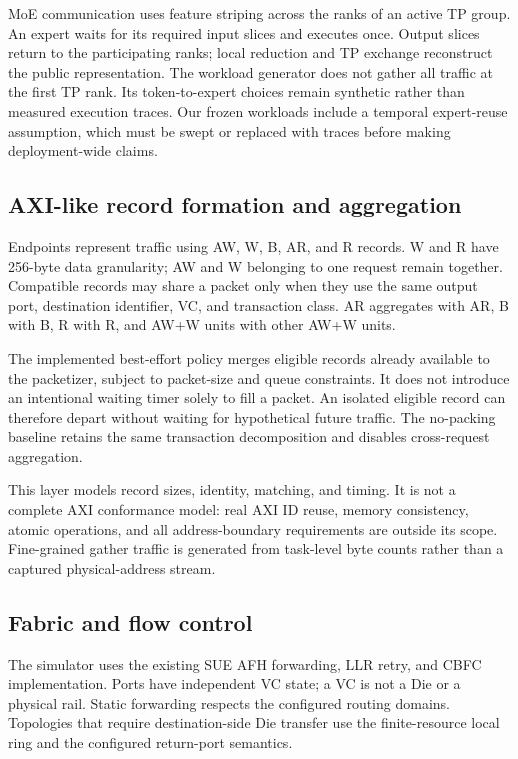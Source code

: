 \documentclass[conference]{IEEEtran}
\begin{document}
MoE communication uses feature striping across the ranks of an active TP group. An expert waits for its required input slices and executes once. Output slices return to the participating ranks; local reduction and TP exchange reconstruct the public representation. The workload generator does not gather all traffic at the first TP rank. Its token-to-expert choices remain synthetic rather than measured execution traces. Our frozen workloads include a temporal expert-reuse assumption, which must be swept or replaced with traces before making deployment-wide claims.

\subsection{AXI-like record formation and aggregation}
Endpoints represent traffic using AW, W, B, AR, and R records. W and R have 256-byte data granularity; AW and W belonging to one request remain together. Compatible records may share a packet only when they use the same output port, destination identifier, VC, and transaction class. AR aggregates with AR, B with B, R with R, and AW+W units with other AW+W units.

The implemented best-effort policy merges eligible records already available to the packetizer, subject to packet-size and queue constraints. It does not introduce an intentional waiting timer solely to fill a packet. An isolated eligible record can therefore depart without waiting for hypothetical future traffic. The no-packing baseline retains the same transaction decomposition and disables cross-request aggregation.

This layer models record sizes, identity, matching, and timing. It is not a complete AXI conformance model: real AXI ID reuse, memory consistency, atomic operations, and all address-boundary requirements are outside its scope. Fine-grained gather traffic is generated from task-level byte counts rather than a captured physical-address stream.

\subsection{Fabric and flow control}
The simulator uses the existing SUE AFH forwarding, LLR retry, and CBFC implementation. Ports have independent VC state; a VC is not a Die or a physical rail. Static forwarding respects the configured routing domains. Topologies that require destination-side Die transfer use the finite-resource local ring and the configured return-port semantics.
\end{document}
